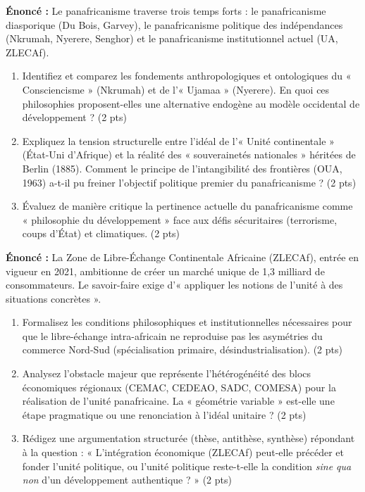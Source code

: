 \documentclass[11pt]{article}
\begin{document}
\begin{exercice}
\textbf{Énoncé :} Le panafricanisme traverse trois temps forts : le panafricanisme diasporique (Du Bois, Garvey), le panafricanisme politique des indépendances (Nkrumah, Nyerere, Senghor) et le panafricanisme institutionnel actuel (UA, ZLECAf).
\begin{enumerate}
    \item Identifiez et comparez les fondements anthropologiques et ontologiques du « Consciencisme » (Nkrumah) et de l'« Ujamaa » (Nyerere). En quoi ces philosophies proposent-elles une alternative endogène au modèle occidental de développement ? (2 pts)
    \item Expliquez la tension structurelle entre l'idéal de l'« Unité continentale » (État-Uni d'Afrique) et la réalité des « souverainetés nationales » héritées de Berlin (1885). Comment le principe de l'intangibilité des frontières (OUA, 1963) a-t-il pu freiner l'objectif politique premier du panafricanisme ? (2 pts)
    \item Évaluez de manière critique la pertinence actuelle du panafricanisme comme « philosophie du développement » face aux défis sécuritaires (terrorisme, coups d'État) et climatiques. (2 pts)
\end{enumerate}
\end{exercice}

\begin{exercice}
\textbf{Énoncé :} La Zone de Libre-Échange Continentale Africaine (ZLECAf), entrée en vigueur en 2021, ambitionne de créer un marché unique de 1,3 milliard de consommateurs. Le savoir-faire exige d'« appliquer les notions de l'unité à des situations concrètes ».
\begin{enumerate}
    \item Formalisez les conditions philosophiques et institutionnelles nécessaires pour que le libre-échange intra-africain ne reproduise pas les asymétries du commerce Nord-Sud (spécialisation primaire, désindustrialisation). (2 pts)
    \item Analysez l'obstacle majeur que représente l'hétérogénéité des blocs économiques régionaux (CEMAC, CEDEAO, SADC, COMESA) pour la réalisation de l'unité panafricaine. La « géométrie variable » est-elle une étape pragmatique ou une renonciation à l'idéal unitaire ? (2 pts)
    \item Rédigez une argumentation structurée (thèse, antithèse, synthèse) répondant à la question : « L'intégration économique (ZLECAf) peut-elle précéder et fonder l'unité politique, ou l'unité politique reste-t-elle la condition \textit{sine qua non} d'un développement authentique ? » (2 pts)
\end{enumerate}
\end{exercice}
\end{document}
